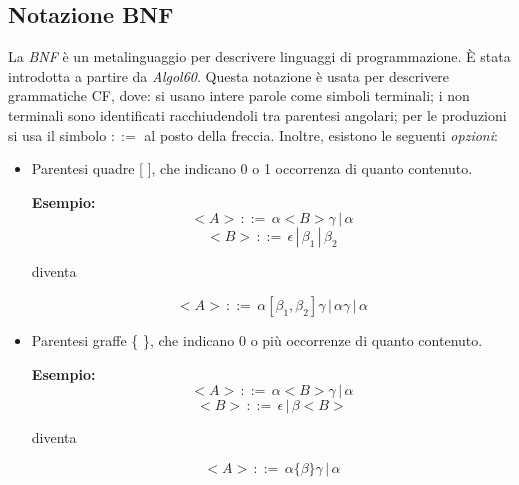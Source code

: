 \documentclass[a4paper,oneside,titlepage]{book}
\begin{document}
\subsection{Notazione BNF}
La \textit{BNF} è un metalinguaggio per descrivere linguaggi di programmazione. È stata introdotta a partire da \textit{Algol60}. Questa notazione è usata per descrivere grammatiche CF, dove: si usano intere parole come simboli terminali; i non terminali sono identificati racchiudendoli tra parentesi angolari; per le produzioni si usa il simbolo $::=$ al posto della freccia. Inoltre, esistono le seguenti \textit{opzioni}:
\begin{itemize}
	\item Parentesi quadre [ ], che indicano 0 o 1 occorrenza di quanto contenuto.
	
		\textbf{Esempio:}
		\[ <A> \, ::= \, \alpha <B> \gamma \, | \, \alpha \]
		\[ <B> \, ::= \, \epsilon \, | \, \beta_1 \, | \, \beta_2 \]
		\begin{center}
			diventa
		\end{center}
		\[ <A> \, ::= \, \alpha [\beta_1, \beta_2] \gamma \, | \, \alpha \gamma \, | \, \alpha \]
	\item Parentesi graffe \{ \}, che indicano 0 o più occorrenze di quanto contenuto.
	
		\textbf{Esempio:}
		\[ <A> \, ::= \, \alpha <B> \gamma \, | \, \alpha \]
		\[ <B> \, ::= \, \epsilon \, | \, \beta <B> \]
		\begin{center}
			diventa
		\end{center}
		\[ <A> \, ::= \, \alpha \{\beta\} \gamma \, | \, \alpha \]
\end{itemize}
\end{document}

